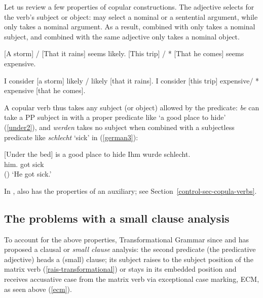 Let us review a few properties of copular constructions.
The adjective selects for the verb's subject or object:  may select a nominal or a
sentential argument, while  only takes a nominal argument. As a result, 
combined with  only takes a nominal subject, and  combined with the
same adjective only takes a nominal object. 


\begin{exe}
\ex \label{storm}
\begin{xlist}
\ex{} [A storm] / [That it rains] seems likely.
\ex{} [This trip] / * [That he comes] seems expensive.
\end{xlist}
\ex \begin{xlist}
\ex 	I consider [a storm] likely / likely [that it rains].
\ex 	I consider [this trip] expensive/ * expensive [that he comes].
\end{xlist}	
\end{exe}


A copular verb thus takes any subject (or object) allowed by the predicate: \emph{be} can take a PP
subject in  with a proper predicate like `a good place to hide' (\ref{under2}), and \emph{werden} takes no subject when combined with a
subjectless predicate like \emph{schlecht} `sick' in  (\ref{german3}):

\eal
\ex{}[Under the bed] is a good place to hide \label{under2}
\ex
\label{german3} 
\gll Ihm        wurde schlecht.\footnotemark\\
     him.\DAT{} got   sick\\\hfill()
\glt `He got sick.'
\zl

\noindent
In ,  also has the properties of an auxiliary; see Section~\ref{control-sec-copula-verbs}.

\subsection{The problems with a small clause analysis}

To account for the above properties, Transformational Grammar since \citet{Stowell1983}\addpages and
\citet{Chomsky1986}\addpages has proposed a clausal or \emph{small clause} analysis: the second predicate
(the predicative adjective) heads a (small) clause; its subject raises to the subject position of the
matrix verb (\ref{rais-transformational}) or stays in its embedded position and receives accusative case from
the matrix verb via exceptional case marking, ECM, as seen above (\ref{ecm}).


